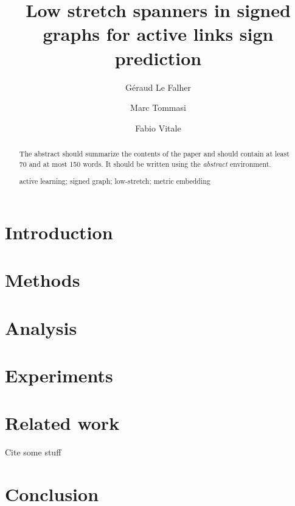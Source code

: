 \documentclass[runningheads,a4paper]{llncs}
\newcommand{\keywords}[1]{\par\addvspace\baselineskip
\noindent\keywordname\enspace\ignorespaces#1}
\begin{document}
\mainmatter
\title{Low stretch spanners in signed graphs for active links sign prediction}
\author{Géraud Le Falher \and Marc Tommasi \and Fabio Vitale}
\maketitle


\begin{abstract}
The abstract should summarize the contents of the paper and should
contain at least 70 and at most 150 words. It should be written using the
\emph{abstract} environment.
\keywords{active learning; signed graph; low-stretch; metric embedding}
\end{abstract}


\section{Introduction}

\section{Methods}

\section{Analysis}

\section{Experiments}

\section{Related work}
Cite some stuff \cite{Cesa-Bianchi2012a}

\section{Conclusion}



\end{document}
